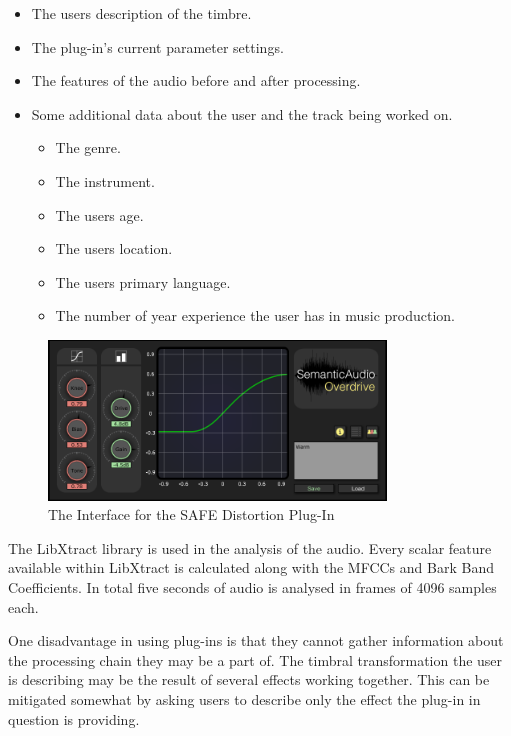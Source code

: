 		\begin{itemize}
			\item The users description of the timbre.
			\item The plug-in's current parameter settings.
			\item The features of the audio before and after processing.
			\item Some additional data about the user and the track being worked on.
			\begin{itemize}
				\item The genre.
				\item The instrument.
				\item The users age.
				\item The users location.
				\item The users primary language.
				\item The number of year experience the user has in music production.
			\end{itemize}
		\end{itemize}

		\begin{figure}[h!]
			\centering
			\includegraphics[width=0.8\textwidth]{chapter4/Images/SAFEDistortion.png}
			\caption{The Interface for the SAFE Distortion Plug-In}
			\label{fig:SAFE-Distortion}
		\end{figure}

		The LibXtract library \citep{bullock2007libxtract} is used in the analysis of the audio. Every scalar
		feature available within LibXtract is calculated along with the MFCCs and Bark Band Coefficients. In total
		five seconds of audio is analysed in frames of 4096 samples each.


		One disadvantage in using plug-ins is that they cannot gather information about the processing chain they
		may be a part of. The timbral transformation the user is describing may be the result of several effects
		working together. This can be mitigated somewhat by asking users to describe only the effect the plug-in in
		question is providing.

